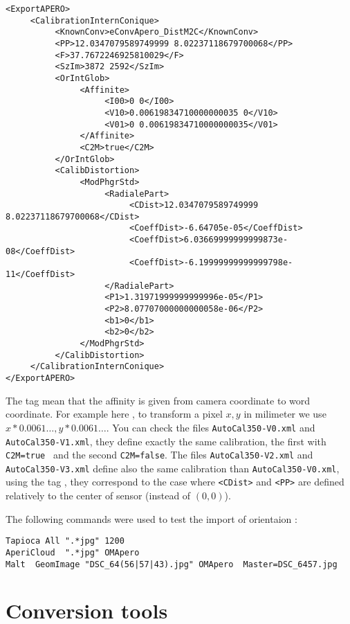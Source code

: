 \begin{verbatim}
<ExportAPERO>
     <CalibrationInternConique>
          <KnownConv>eConvApero_DistM2C</KnownConv>
          <PP>12.0347079589749999 8.02237118679700068</PP>
          <F>37.7672246925810029</F>
          <SzIm>3872 2592</SzIm>
          <OrIntGlob>
               <Affinite>
                    <I00>0 0</I00>
                    <V10>0.00619834710000000035 0</V10>
                    <V01>0 0.00619834710000000035</V01>
               </Affinite>
               <C2M>true</C2M>
          </OrIntGlob>
          <CalibDistortion>
               <ModPhgrStd>
                    <RadialePart>
                         <CDist>12.0347079589749999 8.02237118679700068</CDist>
                         <CoeffDist>-6.64705e-05</CoeffDist>
                         <CoeffDist>6.03669999999999873e-08</CoeffDist>
                         <CoeffDist>-6.19999999999999798e-11</CoeffDist>
                    </RadialePart>
                    <P1>1.31971999999999996e-05</P1>
                    <P2>8.07707000000000058e-06</P2>
                    <b1>0</b1>
                    <b2>0</b2>
               </ModPhgrStd>
          </CalibDistortion>
     </CalibrationInternConique>
</ExportAPERO>
\end{verbatim}


The tag {\tt <C2M>} mean that the affinity is given from camera coordinate to word coordinate.
For example here , to transform a pixel $x,y$ in milimeter we use $x*0.0061\dots,y*0.0061\dots$.
You can check the files {\tt AutoCal350-V0.xml} and {\tt AutoCal350-V1.xml},
they define exactly the same calibration, the first with {\tt C2M=true } and the second {\tt C2M=false}.
The files {\tt AutoCal350-V2.xml} and {\tt AutoCal350-V3.xml} define also the same
calibration than  {\tt AutoCal350-V0.xml}, using the tag {\tt <I00>}, they correspond to the case
where  {\tt  <CDist>} and {\tt <PP>} are defined relatively to the center of sensor (instead of $(0,0)$).


The following commands were used to test the import of orientaion :

\begin{verbatim}
Tapioca All ".*jpg" 1200
AperiCloud  ".*jpg" OMApero
Malt  GeomImage "DSC_64(56|57|43).jpg" OMApero  Master=DSC_6457.jpg
\end{verbatim}

\section{Conversion tools}

